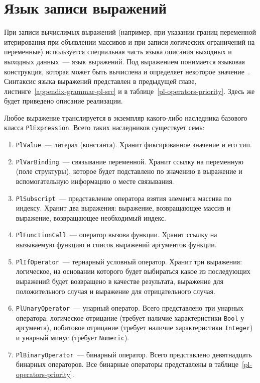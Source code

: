 \documentclass[times,specification,annotation]{style/itmo-student-thesis/itmo-student-thesis}
\begin{document}
\section{Язык записи выражений}

При записи вычислимых выражений (например, при указании границ переменной итерирования при объявлении массивов и при записи логических ограничений на переменные) используется специальная часть языка описания выходных и выходных данных~--- язык выражений. Под выражением понимается языковая конструкция, которая может быть вычислена и определяет некоторое значение~\cite{mitchell2003concepts}. Синтаксис языка выражений представлен в предыдущей главе, листинге~\ref{appendix-grammar-pl-src} и в таблице~\ref{pl-operators-priority}. Здесь же будет приведено описание реализации.

Любое выражение транслируется в экземпляр какого-либо наследника базового класса \texttt{PlExpression}. Всего таких наследников существует семь:

\begin{enumerate}
    \item \texttt{PlValue}~--- литерал (константа). Хранит фиксированное значение и его тип.
    \item \texttt{PlVarBinding}~--- связывание переменной. Хранит ссылку на переменную (поле структуры), которое будет подставлено по значению в выражение и вспомогательную информацию о месте связывания.
    \item \texttt{PlSubscript}~--- представление оператора взятия элемента массива по индексу. Хранит два выражения: выражение, возвращающее массив и выражение, возвращающее необходимый индекс.
    \item \texttt{PlFunctionCall}~--- оператор вызова функции. Хранит ссылку на вызываемую функцию и список выражений аргументов функции.
    \item \texttt{PlIfOperator}~--- тернарный условный оператор. Хранит три выражения: логическое, на основании которого будет выбираться какое из последующих выражений будет возвращено в качестве результата, выражение для положительного случая и выражение для отрицательного случая.
    \item \texttt{PlUnaryOperator}~--- унарный оператор. Всего представлено три унарных оператора: логическое отрицание (требует наличие характеристики \texttt{Bool} у аргумента), побитовое отрицание (требует наличие характеристики \texttt{Integer}) и унарный минус (требует \texttt{Numeric}).
    \item \texttt{PlBinaryOperator}~--- бинарный оператор. Всего представлено девятнадцать бинарных операторов. Все бинарные операторы представлены в таблице~\ref{pl-operators-priority}.
\end{enumerate}
\end{document}
